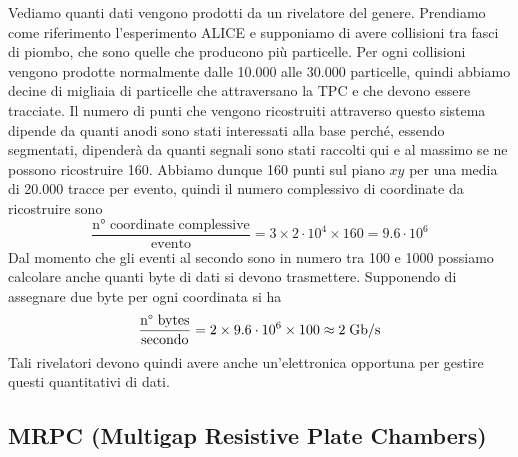 \begin{esempio}
   Vediamo quanti dati vengono prodotti da un rivelatore del genere. Prendiamo come riferimento l'esperimento ALICE e supponiamo di avere collisioni tra fasci di piombo, che sono quelle che producono più particelle. Per ogni collisioni vengono prodotte normalmente dalle 10.000 alle 30.000 particelle, quindi abbiamo decine di migliaia di particelle che attraversano la TPC e che devono essere tracciate. Il numero di punti che vengono ricostruiti attraverso questo sistema dipende da quanti anodi sono stati interessati alla base perché, essendo segmentati, dipenderà da quanti segnali sono stati raccolti qui e al massimo se ne possono ricostruire 160. Abbiamo dunque 160 punti sul piano $xy$ per una media di 20.000 tracce per evento, quindi il numero complessivo di coordinate da ricostruire sono
   \begin{equation*}
      \frac{\text{n° coordinate complessive}}{\text{evento}}
      =3 \times 2 \cdot 10^4 \times 160
      =9.6 \cdot 10^6
   \end{equation*}
   Dal momento che gli eventi al secondo sono in numero tra 100 e 1000 possiamo calcolare anche quanti byte di dati si devono trasmettere. Supponendo di assegnare due byte per ogni coordinata si ha
   \begin{equation*}
      \frac{\text{n° bytes}}{\text{secondo}}
      =2 \times 9.6 \cdot 10^6 \times 100
      \approx 2 \; \rm Gb/s
   \end{equation*}
   Tali rivelatori devono quindi avere anche un'elettronica opportuna per gestire questi quantitativi di dati.
\end{esempio}

\subsection{MRPC (Multigap Resistive Plate Chambers)}

